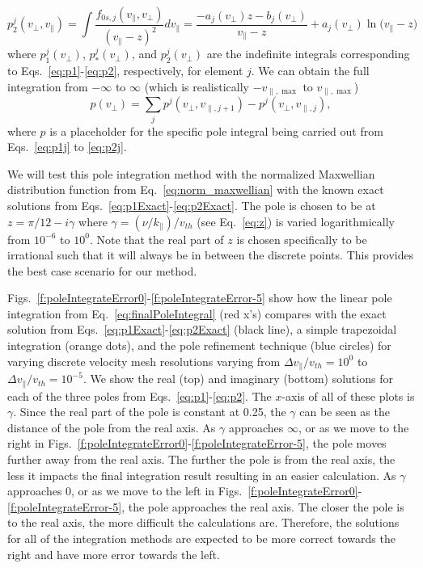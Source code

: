 \begin{equation}
	p_2^j (v_\perp, v_\parallel) =\int \frac{f_{0s,j}(v_\parallel,v_\perp)}{(v_\parallel - z)^2} dv_\parallel = 
	\frac{-a_j(v_\perp)z - b_j(v_\perp)}{v_\parallel - z} + a_j(v_\perp) \ln\big(v_\parallel-z\big)
	\label{eq:p2j}
\end{equation}
where $p_1^j(v_\perp)$, $p_*^j(v_\perp)$, and $p_2^j(v_\perp)$ are the indefinite integrals corresponding to 
Eqs.~\ref{eq:p1}-\ref{eq:p2}, respectively, for element $j$.
We can obtain the full integration from $-\infty$ to $\infty$ (which is realistically $-v_{\parallel,\max}$ to $v_{\parallel,\max}$)
\begin{equation}
	p(v_\perp) = \sum_j p^j(v_\perp, v_{\parallel,j+1}) - p^j(v_\perp, v_{\parallel,j}),
	\label{eq:finalPoleIntegral}
\end{equation}
where $p$ is a placeholder for the specific pole integral being carried out from Eqs.~\ref{eq:p1j} to \ref{eq:p2j}.


We will test this pole integration method with the normalized Maxwellian distribution function from Eq.~\ref{eq:norm_maxwellian} with the known exact solutions from Eqs.~\ref{eq:p1Exact}-\ref{eq:p2Exact}.
The pole is chosen to be at $z=\pi/12 - i \gamma$ where $\gamma=(\nu/k_\parallel)/v_{th}$ (see Eq.~\ref{eq:z}) is varied logarithmically from $10^{-6}$ to $10^{0}$.
Note that the real part of $z$ is chosen specifically to be irrational such that it will always be in between the discrete points. 
This provides the best case scenario for our method.

Figs.~\ref{f:poleIntegrateError0}-\ref{f:poleIntegrateError-5} show how the linear pole integration from Eq.~\ref{eq:finalPoleIntegral} (red x's) compares with the exact solution from Eqs.~\ref{eq:p1Exact}-\ref{eq:p2Exact} (black line), a simple trapezoidal integration (orange dots), and the pole refinement technique \citep{longley2024} (blue circles) for varying discrete velocity mesh resolutions varying from $\Delta v_\parallel/v_{th}=10^0$ to $\Delta v_\parallel/v_{th}=10^{-5}$.
We show the real (top) and imaginary (bottom) solutions for each of the three poles from Eqs.~\ref{eq:p1}-\ref{eq:p2}.
The $x$-axis of all of these plots is $\gamma$. 
Since the real part of the pole is constant at 0.25, the $\gamma$ can be seen as the distance of the pole from the real axis.
As $\gamma$ approaches $\infty$, or as we move to the right in Figs.~\ref{f:poleIntegrateError0}-\ref{f:poleIntegrateError-5}, the pole moves further away from the real axis.
The further the pole is from the real axis, the less it impacts the final integration result resulting in an easier calculation.
As $\gamma$ approaches 0, or as we move to the left in Figs.~\ref{f:poleIntegrateError0}-\ref{f:poleIntegrateError-5}, the pole approaches the real axis.
The closer the pole is to the real axis, the more difficult the calculations are.
Therefore, the solutions for all of the integration methods are expected to be more correct towards the right and have more error towards the left.

